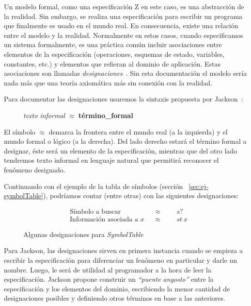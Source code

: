 Un modelo formal, como una especificación Z en este caso, es una abstracción de la realidad. Sin embargo, se realiza una especificación para escribir un programa que finalmente es usado en el mundo real. En consecuencia, existe una relación entre el modelo y la realidad.
Normalmente en estos casos, cuando especificamos un sistema formalmente, es una práctica común incluir asociaciones entre elementos de la especificación (operaciones, esquemas de estado, variables, constantes, etc.) y elementos que refieran al dominio de aplicación. Estas asociaciones son llamadas \emph{designaciones}~\cite{jackson}.
Sin esta documentación el modelo sería nada más que una teoría axiomática más sin conexión con la realidad. 

Para documentar las designaciones usaremos la sintaxis propuesta por Jackson~\cite{jackson}:

\begin{figure}[H]
  \centering
  \emph{texto informal} $\approx$ \textbf{término\_formal}
\end{figure}

El símbolo $\approx$ demarca la frontera entre el mundo real (a la izquierda) y el mundo formal o lógico (a la derecha). Del lado derecho estará el término formal a designar, éste será un elemento de la especificación, mientras que del otro lado tendremos texto informal en lenguaje natural que permitirá reconocer el fenómeno designado.

Continuando con el ejemplo de la tabla de símbolos (sección ~\ref{sec:ej-symbolTable}), podríamos contar (entre otras) con las siguientes designaciones:

\begin{figure}[H]
  \begin{align*} 
    &\text{Símbolo a buscar} && \approx &&&s? \\
    &\text{Información asociada a $x$} && \approx &&&st~x
  \end{align*}
  \caption{Algunas designaciones para \emph{SymbolTable}}
  \label{fig:ej_designacion}
\end{figure}


Para Jackson, las designaciones sirven en primera instancia cuando se empieza a escribir la especificación para diferenciar un fenómeno en particular y darle un nombre. Luego, le será de utilidad al programador a la hora de leer la especificación. Jackson propone construir un \emph{``puente angosto''} entre la especificación y los elementos del dominio, escribiendo la menor cantidad de designaciones posibles y definiendo otros términos en base a las anteriores.


